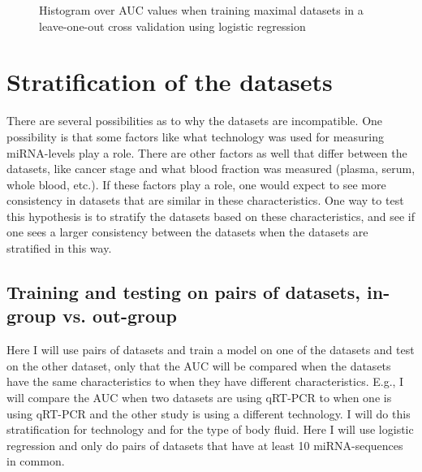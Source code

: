 {{{{{{{{{\begin{figure}
    \centering
    \caption{Histogram over AUC values when training maximal datasets in a leave-one-out cross validation using logistic regression}
    \label{fig:auc_maximal}
\end{figure}

\section{Stratification of the datasets}
\label{sec:res_stratification}
There are several possibilities as to why the datasets are incompatible. One possibility is that some factors like what technology was used for measuring miRNA-levels play a role. There are other factors as well that differ between the datasets, like cancer stage and what blood fraction was measured (plasma, serum, whole blood, etc.). If these factors play a role, one would expect to see more consistency in datasets that are similar in these characteristics. One way to test this hypothesis is to stratify the datasets based on these characteristics, and see if one sees a larger consistency between the datasets when the datasets are stratified in this way.

\subsection{Training and testing on pairs of datasets, in-group vs. out-group}
\label{subsec:res_strat_two}
Here I will use pairs of datasets and train a model on one of the datasets and test on the other dataset, only that the AUC will be compared when the datasets have the same characteristics to when they have different characteristics. E.g., I will compare the AUC when two datasets are using qRT-PCR to when one is using qRT-PCR and the other study is using a different technology. I will do this stratification for technology and for the type of body fluid. Here I will use logistic regression and only do pairs of datasets that have at least 10 miRNA-sequences in common.

}}}}}}}}}
